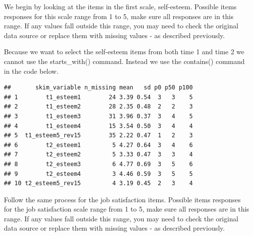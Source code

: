 \documentclass[
]{krantz}
\makeatletter
\newenvironment{Shaded}{\begin{snugshade}}{\end{snugshade}}
\newcommand{\KeywordTok}[1]{\textcolor[rgb]{0.27,0.27,0.27}{\textbf{#1}}}
\newcommand{\NormalTok}[1]{#1}
\newcommand{\OperatorTok}[1]{\textcolor[rgb]{0.43,0.43,0.43}{\textbf{#1}}}
\newcommand{\StringTok}[1]{\textcolor[rgb]{0.5,0.5,0.5}{#1}}
\newenvironment{kframe}{%
\medskip{}
\setlength{\fboxsep}{.8em}
 \def\at@end@of@kframe{}%
 \ifinner\ifhmode%
  \def\at@end@of@kframe{\end{minipage}}%
  \begin{minipage}{\columnwidth}%
 \fi\fi%
 \def\FrameCommand##1{\hskip\@totalleftmargin \hskip-\fboxsep
 \colorbox{shadecolor}{##1}\hskip-\fboxsep
     \hskip-\linewidth \hskip-\@totalleftmargin \hskip\columnwidth}%
 \MakeFramed {\advance\hsize-\width
   \@totalleftmargin\z@ \linewidth\hsize
   \@setminipage}}%
 {\par\unskip\endMakeFramed%
 \at@end@of@kframe}
\renewenvironment{Shaded}{\begin{kframe}}{\end{kframe}}
\makeatother
\begin{document}
We begin by looking at the items in the first scale, self-esteem. Possible items responses for this scale range from 1 to 5, make sure all responses are in this range. If any values fall outside this range, you may need to check the original data source or replace them with missing values - as described previously.

Because we want to select the self-esteem items from both time 1 and time 2 we cannot use the starts\_with() command. Instead we use the contains() command in the code below.

\begin{Shaded}
\end{Shaded}

\begin{verbatim}
##       skim_variable n_missing mean   sd p0 p50 p100
## 1        t1_esteem1        24 3.39 0.54  3   3    5
## 2        t1_esteem2        28 2.35 0.48  2   2    3
## 3        t1_esteem3        31 3.96 0.37  3   4    5
## 4        t1_esteem4        15 3.54 0.50  3   4    4
## 5  t1_esteem5_rev15        35 2.22 0.47  1   2    3
## 6        t2_esteem1         5 4.27 0.64  3   4    6
## 7        t2_esteem2         5 3.33 0.47  3   3    4
## 8        t2_esteem3         6 4.77 0.69  3   5    6
## 9        t2_esteem4         3 4.46 0.59  3   5    5
## 10 t2_esteem5_rev15         4 3.19 0.45  2   3    4
\end{verbatim}

Follow the same process for the job satisfaction items. Possible items responses for the job satisfaction scale range from 1 to 5, make sure all responses are in this range. If any values fall outside this range, you may need to check the original data source or replace them with missing values - as described previously.

\begin{Shaded}
\end{Shaded}
\end{document}
